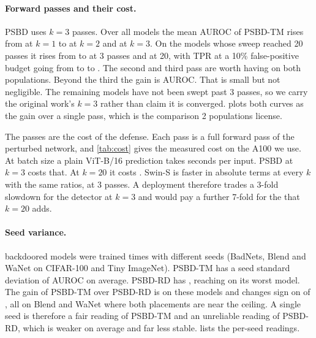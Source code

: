 \paragraph{Forward passes and their cost.}
\label{sec:robustness:passes}

PSBD uses $k = 3$ passes. Over all \PassAllCells{} models the mean AUROC of PSBD-TM rises from \PassAllAurocKOne{} at $k = 1$ to \PassAllAurocKTwo{} at $k = 2$ and \PassAllAurocKThree{} at $k = 3$. On the \PassPilotCells{} models whose sweep reached 20 passes it rises from \PassPilotAurocKOne{} to \PassPilotAurocKThree{} at 3 passes and \PassPilotAurocKTwoZero{} at 20, with TPR at a 10\% false-positive budget going from \PassPilotTprOneZeroKOne{} to \PassPilotTprOneZeroKThree{} to \PassPilotTprOneZeroKTwoZero{}. The second and third pass are worth having on both populations. Beyond the third the gain is \PassPilotAurocGainBeyondThree{} AUROC. That is small but not negligible. The remaining models have not been swept past 3 passes, so we carry the original work's $k = 3$ rather than claim it is converged.  plots both curves as the gain over a single pass, which is the comparison 2 populations license.


The passes are the cost of the defense. Each pass is a full forward pass of the perturbed network, and \cref{tab:cost} gives the measured cost on the A100 we use. At batch size \CostBatchSize{} a plain ViT-B/16 prediction takes \CostPlainSecondsVit{} seconds per input. PSBD at $k = 3$ costs \CostSlowdownKThreeVit{} that. At $k = 20$ it costs \CostSlowdownKTwoZeroVit{}. Swin-S is faster in absolute terms at every $k$ with the same ratios, \CostSlowdownKThreeSwin{} at 3 passes. A deployment therefore trades a 3-fold slowdown for the detector at $k = 3$ and would pay a further 7-fold for the \PassPilotAurocGainBeyondThree{} that $k = 20$ adds.

\paragraph{Seed variance.}
\label{sec:robustness:seeds}

\SeedCells{} backdoored models were trained \SeedsPerCell{} times with different seeds (BadNets, Blend and WaNet on CIFAR-100 and Tiny ImageNet). PSBD-TM has a seed standard deviation of \SeedSdRecommended{} AUROC on average. PSBD-RD has \SeedSdPublished{}, reaching \SeedSdGainMax{} on its worst model. The gain of PSBD-TM over PSBD-RD is \SeedGainMean{} on these models and changes sign on \SeedGainSignFlips{} of \SeedCells{}, all on Blend and WaNet where both placements are near the ceiling. A single seed is therefore a fair reading of PSBD-TM and an unreliable reading of PSBD-RD, which is weaker on average and far less stable.  lists the per-seed readings.

